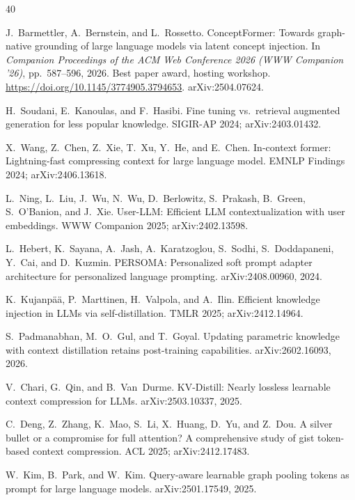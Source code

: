 \documentclass{article}
\begin{document}
\small
\begin{thebibliography}{40}

 J.~Barmettler, A.~Bernstein, and L.~Rossetto.
\newblock ConceptFormer: Towards graph-native grounding of large language models via latent
  concept injection.
\newblock In \emph{Companion Proceedings of the ACM Web Conference 2026 (WWW Companion '26)},
  pp.~587--596, 2026. Best paper award, hosting workshop.
  \url{https://doi.org/10.1145/3774905.3794653}. arXiv:2504.07624.

 H.~Soudani, E.~Kanoulas, and F.~Hasibi.
\newblock Fine tuning vs.\ retrieval augmented generation for less popular knowledge.
\newblock SIGIR-AP 2024; arXiv:2403.01432.

 X.~Wang, Z.~Chen, Z.~Xie, T.~Xu, Y.~He, and E.~Chen.
\newblock In-context former: Lightning-fast compressing context for large language model.
\newblock EMNLP Findings 2024; arXiv:2406.13618.

 L.~Ning, L.~Liu, J.~Wu, N.~Wu, D.~Berlowitz, S.~Prakash, B.~Green,
  S.~O'Banion, and J.~Xie.
\newblock User-LLM: Efficient LLM contextualization with user embeddings.
\newblock WWW Companion 2025; arXiv:2402.13598.

 L.~Hebert, K.~Sayana, A.~Jash, A.~Karatzoglou, S.~Sodhi, S.~Doddapaneni,
  Y.~Cai, and D.~Kuzmin.
\newblock PERSOMA: Personalized soft prompt adapter architecture for personalized language
  prompting.
\newblock arXiv:2408.00960, 2024.

 K.~Kujanp\"a\"a, P.~Marttinen, H.~Valpola, and A.~Ilin.
\newblock Efficient knowledge injection in LLMs via self-distillation.
\newblock TMLR 2025; arXiv:2412.14964.

 S.~Padmanabhan, M.~O.~Gul, and T.~Goyal.
\newblock Updating parametric knowledge with context distillation retains post-training
  capabilities.
\newblock arXiv:2602.16093, 2026.

 V.~Chari, G.~Qin, and B.~Van~Durme.
\newblock KV-Distill: Nearly lossless learnable context compression for LLMs.
\newblock arXiv:2503.10337, 2025.

 C.~Deng, Z.~Zhang, K.~Mao, S.~Li, X.~Huang, D.~Yu, and Z.~Dou.
\newblock A silver bullet or a compromise for full attention? A comprehensive study of gist
  token-based context compression.
\newblock ACL 2025; arXiv:2412.17483.

 W.~Kim, B.~Park, and W.~Kim.
\newblock Query-aware learnable graph pooling tokens as prompt for large language models.
\newblock arXiv:2501.17549, 2025.


\end{thebibliography}
\end{document}
